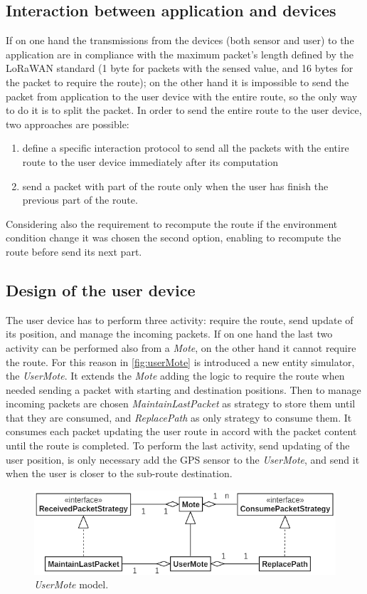 \subsection*{Interaction between application and devices}
If on one hand the transmissions from the devices (both sensor and user) to the application are in compliance with the maximum packet's length defined by the LoRaWAN standard (1 byte for packets with the sensed value, and 16 bytes for the packet to require the route); on the other hand it is impossible to send the packet from application to the user device with the entire route, so the only way to do it is to split the packet.
In order to send the entire route to the user device, two approaches are possible: 
\begin{enumerate}
    \item define a specific interaction protocol to send all the packets with the entire route to the user device immediately after its computation
    \item send a packet with part of the route only when the user has finish the previous part of the route.
\end{enumerate}
Considering also the requirement to recompute the route if the environment condition change it was chosen the second option, enabling to recompute the route before send its next part.

\subsection*{Design of the user device}
The user device has to perform three activity: require the route, send update of its position, and manage the incoming packets.
If on one hand the last two activity can be performed also from a \textit{Mote}, on the other hand it cannot require the route.
For this reason in \autoref{fig:userMote} is introduced a new entity simulator, the \textit{UserMote}. 
It extends the \textit{Mote} adding the logic to require the route when needed sending a packet with starting and destination positions.
Then to manage incoming packets are chosen \textit{MaintainLastPacket} as strategy to store them until that they are consumed, and \textit{ReplacePath} as only strategy to consume them.
It consumes each packet updating the user route in accord with the packet content until the route is completed.
To perform the last activity, send updating of the user position, is only necessary add the GPS sensor to the \textit{UserMote}, and send it when the user is closer to the sub-route destination.
% 
\begin{figure}[h]
    \centering
    \includegraphics{figures/userMote.png}
    \caption{\textit{UserMote} model.}
    \label{fig:userMote}
\end{figure}
% 

